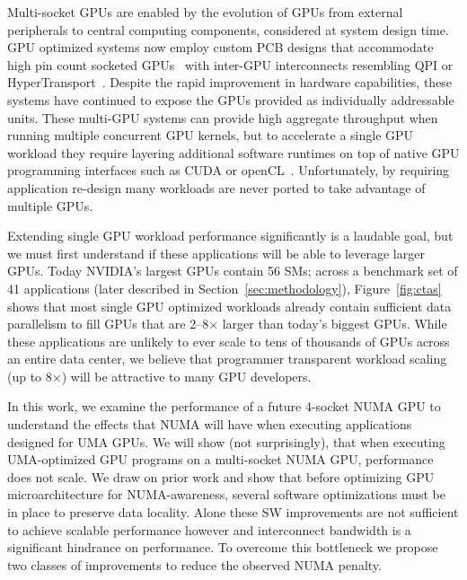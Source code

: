 Multi-socket GPUs are enabled by the evolution of GPUs from external
peripherals to central computing components, considered at system design time.  
GPU optimized systems now employ custom PCB designs that accommodate 
high pin count socketed GPUs~\cite{dgx} with inter-GPU interconnects resembling 
QPI or HyperTransport~\cite{NVLINK,INTELQPI,AMDHT}.  Despite the rapid 
improvement in hardware capabilities, these systems have 
continued to expose the GPUs provided as individually addressable units. These
multi-GPU systems can provide high aggregate throughput when running multiple concurrent
GPU kernels, but to accelerate a single GPU workload they
require layering additional software runtimes on top of native GPU programming 
interfaces such as CUDA or openCL~\cite{CUDA,OPENCL}. Unfortunately, by requiring
application re-design many workloads are never ported to take advantage
of multiple GPUs.

Extending single GPU workload performance significantly is a laudable
goal, but we must first understand if these applications will be able to leverage
larger GPUs.  Today NVIDIA's largest GPUs contain 56 SMs; across a benchmark set of 41 applications
(later described in Section~\ref{sec:methodology}),
Figure~\ref{fig:ctas} shows that most single GPU optimized workloads already
contain sufficient data parallelism to fill GPUs that are 2--8$\times$ larger 
than today's biggest GPUs.  While these applications are unlikely to ever scale to tens
of thousands of GPUs across an entire data center, we believe that programmer
transparent workload scaling (up to 8$\times$) will
be attractive to many GPU developers.

In this work, we examine the performance of a future 4-socket NUMA GPU to 
understand the effects that NUMA will have when executing applications designed 
for UMA GPUs. We will show (not surprisingly), that when executing UMA-optimized 
GPU programs on a multi-socket NUMA GPU, performance does not scale.  We draw on 
prior work and show that before optimizing GPU microarchitecture for 
NUMA-awareness, several software optimizations must be in place to preserve data 
locality.  Alone these SW improvements are not sufficient to achieve scalable 
performance however and interconnect bandwidth is a significant hindrance on 
performance.  To overcome this bottleneck we propose two classes of improvements 
to reduce the observed NUMA penalty.

